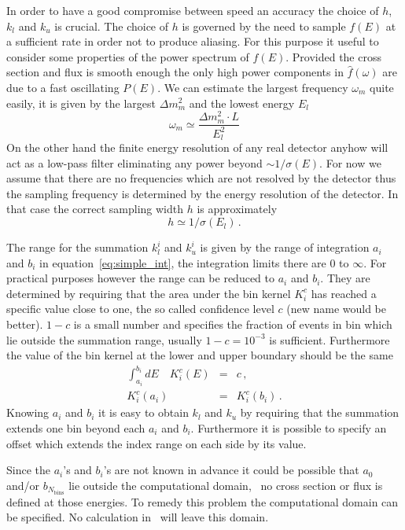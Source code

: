 In order to have a good compromise between speed an accuracy the choice
of $h$, $k_l$ and $k_u$ is crucial. The choice of $h$ is governed by the
need to sample $f(E)$ at a sufficient rate in order not to produce aliasing.
For this purpose it useful to consider some properties of the power spectrum
of $f(E)$. Provided the cross section and flux is smooth enough  the only
high power components in $\hat f(\omega)$ are due to a fast oscillating
$P(E)$. We can estimate the largest frequency $\omega_m$ quite easily, it is
given by the largest $\Delta m^2_m$ and the lowest energy $E_l$
\begin{equation}
\omega_m \simeq \frac{\Delta m^2_m \cdot L}{E_l^2}
\end{equation}
On the other hand the finite energy resolution of any real detector anyhow
will act as a low-pass filter eliminating any power beyond $\sim 1/\sigma(E)$.
For now we assume that there are no frequencies which are not resolved by
the detector thus the sampling frequency is determined by the energy 
resolution of the detector. In that case the correct sampling 
width $h$ is approximately
\begin{equation}
h\simeq 1/\sigma(E_l)\,.
\end{equation} 

The range for the summation $k_l^i$ and $k_u^i$ is given by the range of 
integration $a_i$ and $b_i$ in equation~\ref{eq:simple_int}, the integration 
limits there are $0$ to $\infty$. For practical purposes however the range
can be reduced to $a_i$ and $b_i$. They are  determined by requiring
that the area under the bin kernel $K_i^c$ has reached a specific 
value close to one,
the so called confidence level $c$ (new name would be better). $1-c$ is a 
small number and specifies the fraction of  events in bin which lie outside
the summation range, usually $1-c=10^{-3}$ is sufficient. Furthermore the
value of the bin kernel at the lower and upper boundary should
be the same
\begin{eqnarray}
\int_{a_i}^{b_i} dE\quad K_i^c(E) &=& c\,,\\
K_i^c(a_i)&=&K_i^c(b_i)\,.
\end{eqnarray} 
Knowing $a_i$ and $b_i$ it is easy to obtain $k_l$ and $k_u$ by requiring
that the summation extends one bin beyond  each $a_i$ and $b_i$. Furthermore
it is possible to specify an offset which extends the index range on each side
by its value.

Since the $a_i$'s and $b_i$'s are not known in advance it could be possible
that $a_0$ and/or $b_{N_\mathrm{bins}}$ lie outside the computational domain,
\eg\ no cross section or flux is defined at those energies. To remedy this 
problem the computational domain can be specified. No calculation in \GLOBES\
will leave this domain. 

